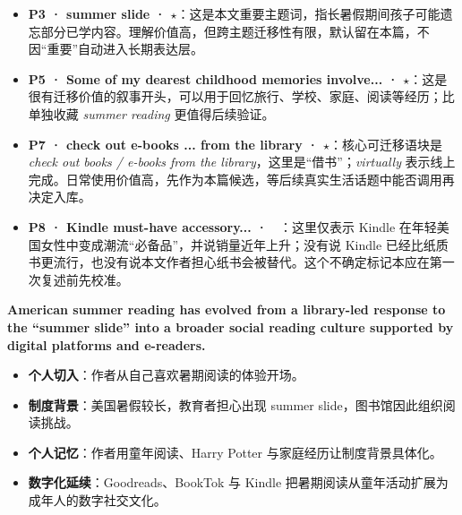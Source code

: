 \documentclass[11pt,a4paper]{ctexart}
\begin{document}


\begin{itemize}
  \item \textbf{P3 · summer slide · $\star$}：这是本文重要主题词，指长暑假期间孩子可能遗忘部分已学内容。理解价值高，但跨主题迁移性有限，默认留在本篇，不因“重要”自动进入长期表达层。
  \item \textbf{P5 · Some of my dearest childhood memories involve... · $\star$}：这是很有迁移价值的叙事开头，可以用于回忆旅行、学校、家庭、阅读等经历；比单独收藏 \textit{summer reading} 更值得后续验证。
  \item \textbf{P7 · check out e-books ... from the library · $\star$}：核心可迁移语块是 \textit{check out books / e-books from the library}，这里是“借书”；\textit{virtually} 表示线上完成。日常使用价值高，先作为本篇候选，等后续真实生活话题中能否调用再决定入库。
  \item \textbf{P8 · Kindle must-have accessory... · \string~}：这里仅表示 Kindle 在年轻美国女性中变成潮流“必备品”，并说销量近年上升；没有说 Kindle 已经比纸质书更流行，也没有说本文作者担心纸书会被替代。这个不确定标记本应在第一次复述前先校准。
\end{itemize}


\begin{coretakeaway}[训练后主旨]
  \textbf{American summer reading has evolved from a library-led response to the ``summer slide'' into a broader social reading culture supported by digital platforms and e-readers.}
\end{coretakeaway}

\begin{itemize}
  \item \textbf{个人切入}：作者从自己喜欢暑期阅读的体验开场。
  \item \textbf{制度背景}：美国暑假较长，教育者担心出现 summer slide，图书馆因此组织阅读挑战。
  \item \textbf{个人记忆}：作者用童年阅读、Harry Potter 与家庭经历让制度背景具体化。
  \item \textbf{数字化延续}：Goodreads、BookTok 与 Kindle 把暑期阅读从童年活动扩展为成年人的数字社交文化。
\end{itemize}
\end{document}
